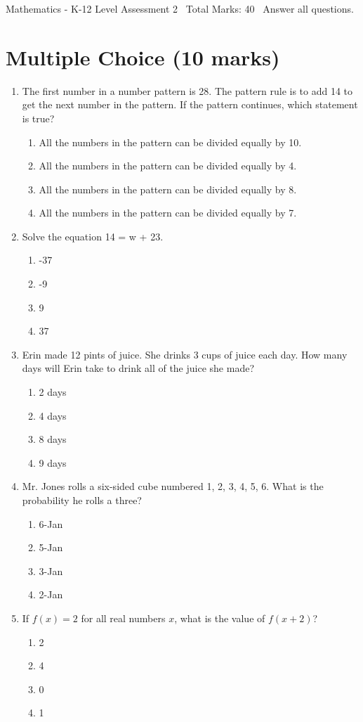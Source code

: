 \documentclass[12pt]{article}
\begin{document}
\begin{center}
Mathematics - K-12 Level Assessment 2 \
Total Marks: 40 \
Answer all questions.
\end{center}

\section*{Multiple Choice (10 marks)}
\begin{enumerate}[label=\arabic*.]
\item The first number in a number pattern is 28. The pattern rule is to add 14 to get the next number in the pattern. If the pattern continues, which statement is true?
\begin{enumerate}[label=(\alph*)]
    \item All the numbers in the pattern can be divided equally by 10.
    \item All the numbers in the pattern can be divided equally by 4.
    \item All the numbers in the pattern can be divided equally by 8.
    \item All the numbers in the pattern can be divided equally by 7.
\end{enumerate}
\item Solve the equation 14 = w + 23.
\begin{enumerate}[label=(\alph*)]
    \item -37
    \item -9
    \item 9
    \item 37
\end{enumerate}
\item Erin made 12 pints of juice. She drinks 3 cups of juice each day. How many days will Erin take to drink all of the juice she made?
\begin{enumerate}[label=(\alph*)]
    \item 2 days
    \item 4 days
    \item 8 days
    \item 9 days
\end{enumerate}
\item Mr. Jones rolls a six-sided cube numbered 1, 2, 3, 4, 5, 6. What is the probability he rolls a three?
\begin{enumerate}[label=(\alph*)]
    \item 6-Jan
    \item 5-Jan
    \item 3-Jan
    \item 2-Jan
\end{enumerate}
\item If $f(x) = 2$ for all real numbers $x$, what is the value of $f(x + 2)$?
\begin{enumerate}[label=(\alph*)]
    \item 2
    \item 4
    \item 0
    \item 1
\end{enumerate}
\end{enumerate}
\end{document}
